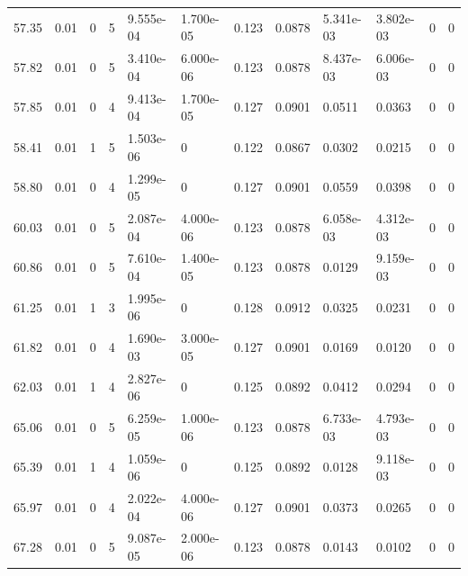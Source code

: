 \documentclass[preview]{standalone}
\begin{document}
{{{\begin{tabular}{L{1.2cm}C{1.2cm} C{0.3cm}C{0.5cm} C{1.4cm}C{1.4cm} C{1.4cm}C{1.4cm} C{1.6cm}C{1.6cm} C{1.6cm}C{1.6cm}}
  57.35  &  0.01  & 0     &  5 &  9.555e-04  & 1.700e-05  &  0.123&   0.0878& 5.341e-03 & 3.802e-03   &  0 & 0  \\ 
  57.82  &  0.01  & 0     &  5 &  3.410e-04  & 6.000e-06  &  0.123&   0.0878& 8.437e-03 & 6.006e-03   &  0 & 0  \\ 
  57.85  &  0.01  & 0     &  4 &  9.413e-04  & 1.700e-05  &  0.127&   0.0901& 0.0511 & 0.0363   &  0 & 0  \\ 
  58.41  &  0.01  & 1     &  5 &  1.503e-06  & 0  &  0.122&   0.0867& 0.0302 & 0.0215   &  0 & 0  \\ 
  58.80  &  0.01  & 0     &  4 &  1.299e-05  & 0  &  0.127&   0.0901& 0.0559 & 0.0398   &  0 & 0  \\ 
  60.03  &  0.01  & 0     &  5 &  2.087e-04  & 4.000e-06  &  0.123&   0.0878& 6.058e-03 & 4.312e-03   &  0 & 0  \\ 
  60.86  &  0.01  & 0     &  5 &  7.610e-04  & 1.400e-05  &  0.123&   0.0878& 0.0129 & 9.159e-03   &  0 & 0  \\ 
  61.25  &  0.01  & 1     &  3 &  1.995e-06  & 0  &  0.128&   0.0912& 0.0325 & 0.0231   &  0 & 0  \\ 
  61.82  &  0.01  & 0     &  4 &  1.690e-03  & 3.000e-05  &  0.127&   0.0901& 0.0169 & 0.0120   &  0 & 0  \\ 
  62.03  &  0.01  & 1     &  4 &  2.827e-06  & 0  &  0.125&   0.0892& 0.0412 & 0.0294   &  0 & 0  \\ 
  65.06  &  0.01  & 0     &  5 &  6.259e-05  & 1.000e-06  &  0.123&   0.0878& 6.733e-03 & 4.793e-03   &  0 & 0  \\ 
  65.39  &  0.01  & 1     &  4 &  1.059e-06  & 0  &  0.125&   0.0892& 0.0128 & 9.118e-03   &  0 & 0  \\ 
  65.97  &  0.01  & 0     &  4 &  2.022e-04  & 4.000e-06  &  0.127&   0.0901& 0.0373 & 0.0265   &  0 & 0  \\ 
  67.28  &  0.01  & 0     &  5 &  9.087e-05  & 2.000e-06  &  0.123&   0.0878& 0.0143 & 0.0102   &  0 & 0  \\ 
\hline 
\end{tabular} 

}}}
\end{document}
